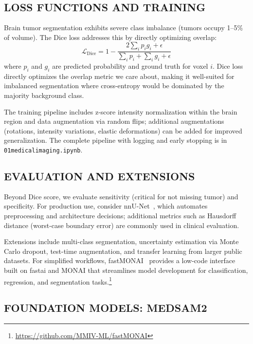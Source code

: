 \documentclass[krantz2,ChapterTOCs]{krantz}
\newcommand{\notebook}[1]{\texttt{\def\_{\textunderscore\allowbreak}#1}}
\begin{document}
\subsection{LOSS FUNCTIONS AND TRAINING}

Brain tumor segmentation exhibits severe class imbalance (tumors occupy 1--5\% of volume). 
The Dice loss addresses this by directly optimizing overlap:
\begin{equation*}
\mathcal{L}_{\text{Dice}} = 1 - \frac{2 \sum_{i} p_i g_i + \epsilon}{\sum_{i} p_i + \sum_{i} g_i + \epsilon}
\label{eq:dice}
\end{equation*}
where $p_i$ and $g_i$ are predicted probability and ground truth for voxel $i$.
Dice loss directly optimizes the overlap metric we care about, making it well-suited for imbalanced segmentation where cross-entropy would be dominated by the majority background class.

The training pipeline includes z-score intensity normalization within the brain region and data augmentation via random flips; additional augmentations (rotations, intensity variations, elastic deformations) can be added for improved generalization.
The complete pipeline with logging and early stopping is in \notebook{01\_medical\_imaging.ipynb}.

\subsection{EVALUATION AND EXTENSIONS}

Beyond Dice score, we evaluate sensitivity (critical for not missing tumor) and specificity.
For production use, consider nnU-Net~\citep{isensee2021nnu}, which automates preprocessing and architecture decisions; additional metrics such as Hausdorff distance (worst-case boundary error) are commonly used in clinical evaluation.

Extensions include multi-class segmentation, uncertainty estimation via Monte Carlo dropout, test-time augmentation, and transfer learning from larger public datasets.
For simplified workflows, fastMONAI~\citep{kaliyugarasan2023fastmonai} provides a low-code interface built on fastai and MONAI that streamlines model development for classification, regression, and segmentation tasks.\footnote{\url{https://github.com/MMIV-ML/fastMONAI}}

\subsection{FOUNDATION MODELS: MEDSAM2}
\end{document}
